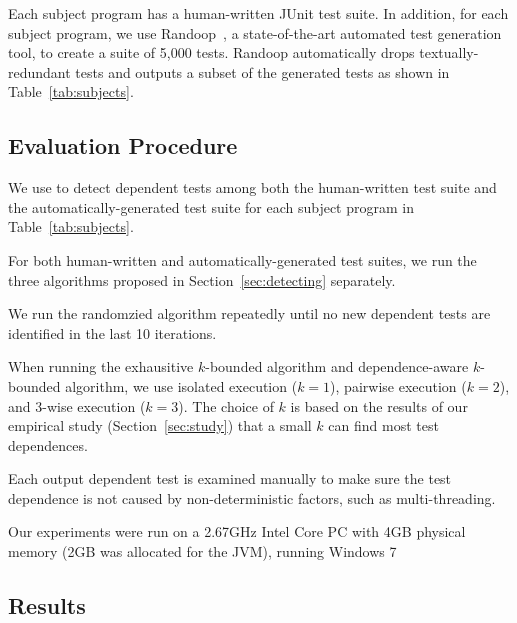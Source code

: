 Each subject program has a human-written JUnit test suite.
In addition, for each subject program, we use
Randoop~\cite{PachecoLET2007}, a state-of-the-art automated
test generation tool, to create a suite of 5,000 tests.
Randoop automatically drops textually-redundant tests 
and outputs a subset of the generated tests as
shown in Table~\ref{tab:subjects}.


\subsection{Evaluation Procedure}

We use \ourtool to detect dependent
tests among both the human-written test suite 
and the automatically-generated test suite
for each subject program in Table~\ref{tab:subjects}.


For both human-written and automatically-generated
test suites, we run the three algorithms proposed
in Section~\ref{sec:detecting} separately.

We run the randomzied algorithm repeatedly until no
new dependent tests are identified in the last
10 iterations.

When running the exhausitive $k$-bounded algorithm and dependence-aware
$k$-bounded algorithm,
we use isolated execution ($k = 1$),
pairwise execution ($k = 2$), and
3-wise execution ($k = 3$). The choice of $k$ is
based on the results of our empirical
study (Section~\ref{sec:study}) that a small $k$
can find most test dependences. 



Each output dependent test is examined manually to make
sure the test dependence is not caused by non-deterministic
factors, such as multi-threading.

Our experiments were run on a 2.67GHz Intel Core PC
with 4GB physical memory (2GB was allocated for the JVM),
running Windows 7

\subsection{Results}

